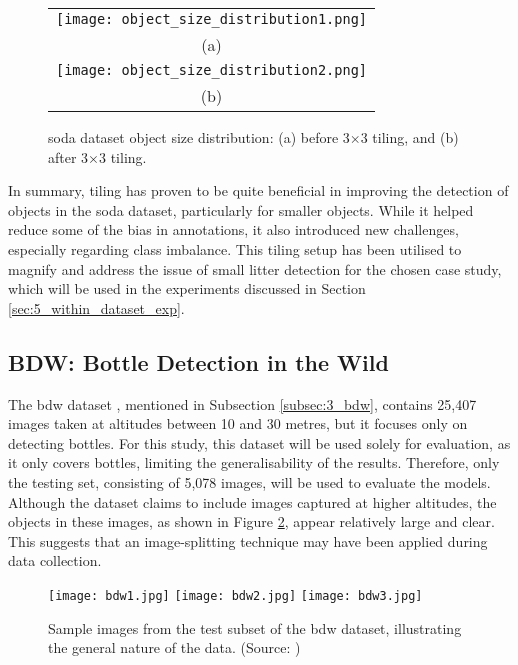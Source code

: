 \begin{figure}[!ht]%
  \centering
  \begin{tabular}{c}
    \texttt{[image: object\_size\_distribution1.png]} \\
    \small (a) \\
    \addlinespace[1em]
    \texttt{[image: object\_size\_distribution2.png]} \\
    \small (b) \\
  \end{tabular}
  \caption{\gls{soda} dataset object size distribution: (a) before 3$\times$3 tiling, and (b) after 3$\times$3 tiling.}
  \label{fig:soda_object_size_distribution}
\end{figure}

In summary, tiling has proven to be quite beneficial in improving the detection of objects in the \gls{soda} dataset, particularly for smaller objects. While it helped reduce some of the bias in annotations, it also introduced new challenges, especially regarding class imbalance. This tiling setup has been utilised to magnify and address the issue of small litter detection for the chosen case study, which will be used in the experiments discussed in Section \ref{sec:5_within_dataset_exp}.


\subsection{BDW: Bottle Detection in the Wild}
\label{subsec:4_bdw}

The \gls{bdw} dataset \cite{bdwdataset}, mentioned in Subsection \ref{subsec:3_bdw}, contains 25,407 images taken at altitudes between 10 and 30 metres, but it focuses only on detecting bottles. For this study, this dataset will be used solely for evaluation, as it only covers bottles, limiting the generalisability of the results. Therefore, only the testing set, consisting of 5,078 images, will be used to evaluate the models. Although the dataset claims to include images captured at higher altitudes, the objects in these images, as shown in Figure \ref{fig:bdw_samples}, appear relatively large and clear. This suggests that an image-splitting technique may have been applied during data collection.

\begin{figure}[!htbp]
  \centering
  \texttt{[image: bdw1.jpg]}
  \hfill
  \texttt{[image: bdw2.jpg]}
  \hfill
  \texttt{[image: bdw3.jpg]}
  \caption{Sample images from the test subset of the \gls{bdw} dataset, illustrating the general nature of the data. (Source: \cite{bdwdataset})}
  \label{fig:bdw_samples}
\end{figure}


